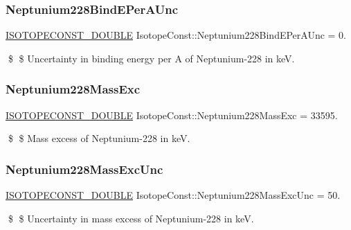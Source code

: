 \subsubsection{\texorpdfstring{Neptunium228\+Bind\+E\+Per\+A\+Unc}{Neptunium228BindEPerAUnc}}
{\footnotesize\ttfamily \mbox{\hyperlink{group___isotope_const-_macros_ga8f45a7272ce02c0b4c65c44636ed719a}{I\+S\+O\+T\+O\+P\+E\+C\+O\+N\+S\+T\+\_\+\+D\+O\+U\+B\+LE}} Isotope\+Const\+::\+Neptunium228\+Bind\+E\+Per\+A\+Unc = 0.}

\$ \$ Uncertainty in binding energy per A of Neptunium-\/228 in keV. \mbox{\label{group___isotope_const-_neptunium-_np228_gab103937c5493d8ed38743e595efbba4b}} 
\subsubsection{\texorpdfstring{Neptunium228\+Mass\+Exc}{Neptunium228MassExc}}
{\footnotesize\ttfamily \mbox{\hyperlink{group___isotope_const-_macros_ga8f45a7272ce02c0b4c65c44636ed719a}{I\+S\+O\+T\+O\+P\+E\+C\+O\+N\+S\+T\+\_\+\+D\+O\+U\+B\+LE}} Isotope\+Const\+::\+Neptunium228\+Mass\+Exc = 33595.}

\$ \$ Mass excess of Neptunium-\/228 in keV. \mbox{\label{group___isotope_const-_neptunium-_np228_gad227a6a9f9b0473d8f6a043f3ade9d7a}} 
\subsubsection{\texorpdfstring{Neptunium228\+Mass\+Exc\+Unc}{Neptunium228MassExcUnc}}
{\footnotesize\ttfamily \mbox{\hyperlink{group___isotope_const-_macros_ga8f45a7272ce02c0b4c65c44636ed719a}{I\+S\+O\+T\+O\+P\+E\+C\+O\+N\+S\+T\+\_\+\+D\+O\+U\+B\+LE}} Isotope\+Const\+::\+Neptunium228\+Mass\+Exc\+Unc = 50.}

\$ \$ Uncertainty in mass excess of Neptunium-\/228 in keV. \mbox{\label{group___isotope_const-_neptunium-_np228_ga8412f49746365c2788bd7dbd66c3da50}} 
